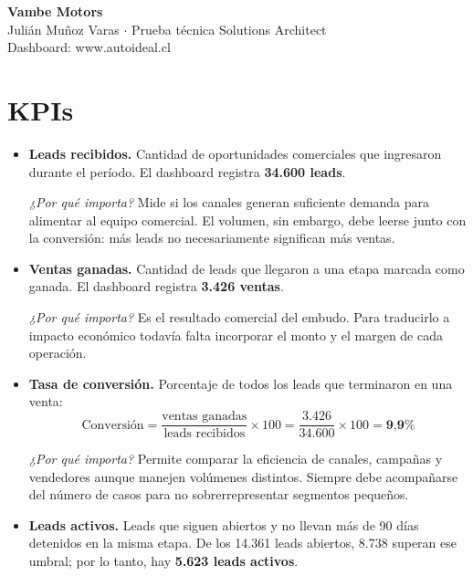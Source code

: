 \documentclass[11pt,a4paper]{article}
\begin{document}
\begin{flushleft}
{\LARGE\color{darkblue}\textbf{Vambe Motors}}\\[0.5em]
{\small
Julián Muñoz Varas $\cdot$
Prueba técnica Solutions Architect\\

Dashboard: www.autoideal.cl
}
\end{flushleft}

\vspace{0.6em}

\section*{KPIs}

\begin{itemize}

\item \textbf{Leads recibidos.}
Cantidad de oportunidades comerciales que ingresaron durante el período. El dashboard registra \textbf{34.600 leads}.

\textit{¿Por qué importa?} Mide si los canales generan suficiente demanda para alimentar al equipo comercial. El volumen, sin embargo, debe leerse junto con la conversión: más leads no necesariamente significan más ventas.

\item \textbf{Ventas ganadas.}
Cantidad de leads que llegaron a una etapa marcada como ganada. El dashboard registra \textbf{3.426 ventas}.

\textit{¿Por qué importa?} Es el resultado comercial del embudo. Para traducirlo a impacto económico todavía falta incorporar el monto y el margen de cada operación.

\item \textbf{Tasa de conversión.}
Porcentaje de todos los leads que terminaron en una venta:
\[
\text{Conversión}=
\frac{\text{ventas ganadas}}{\text{leads recibidos}}\times 100
=\frac{3.426}{34.600}\times 100
=\textbf{9,9\%}
\]

\textit{¿Por qué importa?} Permite comparar la eficiencia de canales, campañas y vendedores aunque manejen volúmenes distintos. Siempre debe acompañarse del número de casos para no sobrerrepresentar segmentos pequeños.

\item \textbf{Leads activos.}
Leads que siguen abiertos y no llevan más de 90 días detenidos en la misma etapa. De los 14.361 leads abiertos, 8.738 superan ese umbral; por lo tanto, hay \textbf{5.623 leads activos}.


\end{itemize}
\end{document}
